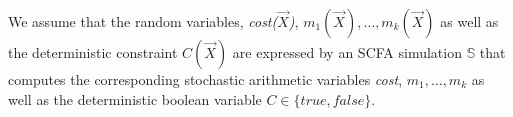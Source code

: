 \documentclass[a4paper, 12pt]{article} %
\begin{document}
We assume that the random variables, \textit{cost($\vec{X}$)}, $m_1(\vec{X}),\dots,m_k(\vec{X})$ as well as the deterministic constraint $C(\vec{X})$ are expressed by an SCFA simulation $\mathbb{S}$ that computes the corresponding stochastic arithmetic variables \textit{cost}, $m_1,\dots,m_k$ as well as the deterministic boolean variable $C \in \{true, false\}$. 


\end{document}
